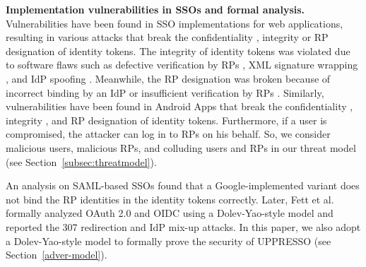 \noindent\textbf{Implementation vulnerabilities in SSOs and formal analysis.}
Vulnerabilities have been found in SSO implementations for web applications, resulting in various attacks %
that break the confidentiality \cite{WangCW12,ccsSunB12,ArmandoCCCPS13,DiscoveringJCS,dimvaLiM16}, integrity \cite{WangCW12,SomorovskyMSKJ12,WangZLG16,MainkaMS16, MainkaMSW17,dimvaLiM16} or RP designation \cite{WangZLG16,MainkaMS16,MainkaMSW17,YangLCZ18,dimvaLiM16} of identity tokens.
The integrity of identity tokens was violated %
due to software flaws such as defective verification by RPs \cite{WangCW12,WangZLG16,MainkaMSW17}, XML signature wrapping \cite{SomorovskyMSKJ12}, and IdP spoofing \cite{MainkaMS16,MainkaMSW17}. Meanwhile, the RP designation was broken because of incorrect binding by an IdP \cite{YangLCZ18,WangZLG16} or insufficient verification by RPs \cite{MainkaMS16,MainkaMSW17,YangLCZ18}. Similarly, vulnerabilities have been found in Android Apps that break the confidentiality \cite{ChenPCTKT14,WangZLLYLG15,YangLS17,ShiWL19}, integrity \cite{ChenPCTKT14,YangLS17}, and RP designation \cite{ChenPCTKT14,ShiWL19} of identity tokens. Furthermore, if a user is compromised, the     attacker can log in to RPs on his behalf. So, we consider malicious users, malicious RPs, and colluding users and RPs in our threat model (see Section~\ref{subsec:threatmodel}).

An analysis on SAML-based SSOs \cite{ArmandoCCCT08} found that a Google-implemented variant does not bind the RP identities in the identity tokens correctly. Later, Fett et al.~\cite{FettKS16, FettKS17} formally analyzed OAuth 2.0 and OIDC using a Dolev-Yao-style model \cite{FettKS14} and reported the 307 redirection and IdP mix-up attacks. In this paper, we also adopt a Dolev-Yao-style model to formally prove the security of UPPRESSO (see Section~\ref{adver-model}).




